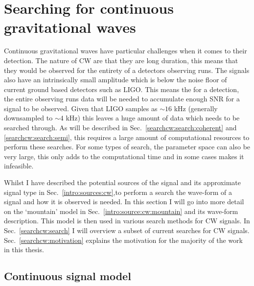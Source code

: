 \chapter{\label{searchcw}Searching for continuous gravitational waves}

Continuous gravitational waves have particular challenges when it comes to their detection.
The nature of \gls{CW} are that they are long duration, this means that they would be observed for the entirety of a detectors observing runs. 
The signals also have an intrinsically small amplitude which is below the noise floor of current ground based detectors such as \gls{LIGO}.
This means the for a detection, the entire observing runs data will be needed to accumulate enough \gls{SNR} for a signal to be observed.
Given that \gls{LIGO} samples as $\sim 16$ kHz (generally downsampled to $\sim 4$ kHz) this leaves a huge amount of data which needs to be searched through.
As will be described in Sec.~\ref{searchcw:search:coherent} and \ref{searchcw:search:semi}, this requires a large amount of computational resources to perform these searches.
For some types of search, the parameter space can also be very large, this only adds to the computational time and in some cases makes it infeasible.

Whilst I have described the potential sources of the signal and its approximate signal type in Sec.~\ref{intro:sources:cw},to perform a search the wave-form of a signal and how it is observed is needed.
In this section I will go into more detail on the `mountain' model in Sec.~\ref{intro:source:cw:mountain} and its wave-form description. 
This model is then used in various search methods for \gls{CW} signals.
In Sec.~\ref{searchcw:search} I will overview a subset of current searches for \gls{CW} signals.
Sec.~\ref{searchcw:motivation} explains the motivation for the majority of the work in this thesis.

\section{\label{searchcw:model}Continuous signal model}

